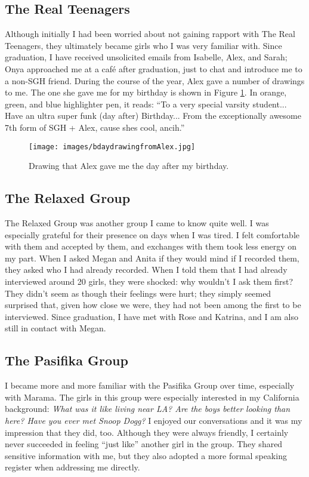 \subsection{The Real Teenagers}
Although initially I had been worried about not gaining rapport with The Real Teenagers, they ultimately became girls who I was very familiar with.  Since graduation, I have received unsolicited emails from Isabelle, Alex, and Sarah; Onya approached me at a caf\'e after graduation, just to chat and introduce me to a non-SGH friend.  During the course of the year, Alex gave a number of drawings to me.  The one she gave me for my birthday is shown in Figure \ref{fig:bdaydrawing}.  In orange, green, and blue highlighter pen, it reads: ``To a very special varsity student... Have an ultra super funk (day after) Birthday... From the exceptionally awesome 7th form of SGH + Alex, cause shes cool, ancih.''


\begin{figure}
	\centering
		\texttt{[image: images/bdaydrawingfromAlex.jpg]}
	\caption{Drawing that Alex gave me the day after my birthday.}
	\label{fig:bdaydrawing}
\end{figure}


\subsection{The Relaxed Group}
The Relaxed Group was another group I came to know quite well.  I was especially grateful for their presence on days when I was tired.  I felt comfortable with them and accepted by them, and exchanges with them took less energy on my part.  When I asked Megan and Anita if they would mind if I recorded them, they asked who I had already recorded.  When I told them that I had already interviewed around 20 girls, they were shocked: why wouldn't I ask them first?  They didn't seem as though their feelings were hurt; they simply seemed surprised that, given how close we were, they had not been among the first to be interviewed.  Since graduation, I have met with Rose and Katrina, and I am also still in contact with Megan.

\subsection{The Pasifika Group}
I became more and more familiar with the Pasifika Group over time, especially with Marama.  The girls in this group were especially interested in my California background: \textit{What was it like living near LA?  Are the boys better looking than here?  Have you ever met Snoop Dogg?}  I enjoyed our conversations and it was my impression that they did, too.  Although they were always friendly, I certainly never succeeded in feeling ``just like'' another girl in the group.  They shared sensitive information with me, but they also adopted a more formal speaking register when addressing me directly.  

